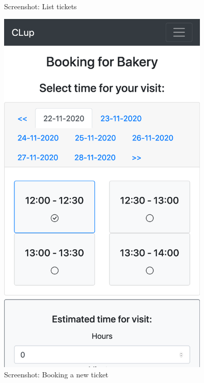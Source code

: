 \begin{figure}[H]
\begin{minipage}{0.45\textwidth}
        \caption{Screenshot: List tickets}
    \end{minipage}\hfill
    \begin{minipage}{0.45\textwidth}
        \centering
        \includegraphics[width=0.9\textwidth]{Images/Screenshots/booking.png} %
        \caption{Screenshot: Booking a new ticket}
    \end{minipage}
\end{figure}

